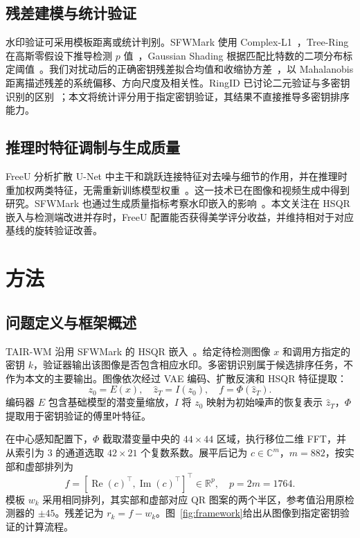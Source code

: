 \documentclass[10pt,twocolumn,letterpaper]{article}
\begin{document}
\subsection{残差建模与统计验证}
水印验证可采用模板距离或统计判别。SFWMark 使用 Complex-L1~\cite{sfw2025}，Tree-Ring 在高斯零假设下推导检测 $p$ 值~\cite{treering2023}，Gaussian Shading 根据匹配比特数的二项分布标定阈值~\cite{gaussianshading2024}。我们对扰动后的正确密钥残差拟合均值和收缩协方差~\cite{ledoit2004}，以 Mahalanobis 距离描述残差的系统偏移、方向尺度及相关性。RingID 已讨论二元验证与多密钥识别的区别~\cite{ringid2024}；本文将统计评分用于指定密钥验证，其结果不直接推导多密钥排序能力。

\subsection{推理时特征调制与生成质量}
FreeU 分析扩散 U-Net 中主干和跳跃连接特征对去噪与细节的作用，并在推理时重加权两类特征，无需重新训练模型权重~\cite{freeu2024}。这一技术已在图像和视频生成中得到研究。SFWMark 也通过生成质量指标考察水印嵌入的影响~\cite{sfw2025}。本文关注在 HSQR 嵌入与检测端改进并存时，FreeU 配置能否获得美学评分收益，并维持相对于对应基线的旋转验证改善。

\section{方法}
\subsection{问题定义与框架概述}
TAIR-WM 沿用 SFWMark 的 HSQR 嵌入~\cite{sfw2025}。给定待检测图像 $x$ 和调用方指定的密钥 $k$，验证器输出该图像是否包含相应水印。多密钥识别属于候选排序任务，不作为本文的主要输出。图像依次经过 VAE 编码、扩散反演和 HSQR 特征提取：
\begin{equation}z_0=E(x),\quad\widehat z_T=I(z_0),\quad f=\Phi(\widehat z_T).\label{eq:flow}\end{equation}
编码器 $E$ 包含基础模型的潜变量缩放，$I$ 将 $z_0$ 映射为初始噪声的恢复表示 $\widehat z_T$，$\Phi$ 提取用于密钥验证的傅里叶特征。

在中心感知配置下，$\Phi$ 截取潜变量中央的 $44\!\times\!44$ 区域，执行移位二维 FFT，并从索引为 3 的通道选取 $42\!\times\!21$ 个复数系数。展平后记为 $c\in\mathbb C^m$，$m=882$，按实部和虚部排列为
\begin{equation}f=[\operatorname{Re}(c)^\top,\operatorname{Im}(c)^\top]^\top\in\mathbb R^p,\quad p=2m=1764.\label{eq:feature}\end{equation}
模板 $w_k$ 采用相同排列，其实部和虚部对应 QR 图案的两个半区，参考值沿用原检测器的 $\pm45$。残差记为 $r_k=f-w_k$。图~\ref{fig:framework}给出从图像到指定密钥验证的计算流程。
\end{document}
